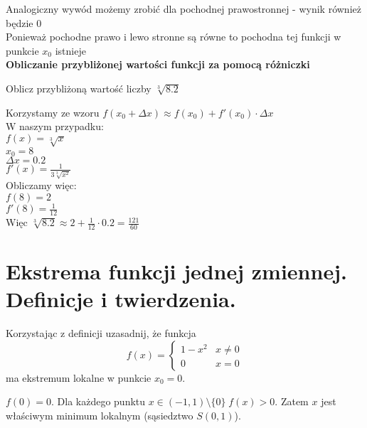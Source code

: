 \documentclass[main.tex]{subfiles}
\begin{document}
    \noindent Analogiczny wywód możemy zrobić dla pochodnej prawostronnej - wynik również będzie 0 \\

    \noindent Ponieważ pochodne prawo i lewo stronne są równe to pochodna tej funkcji w punkcie $x_{0}$ istnieje \\


    \noindent \textbf{Obliczanie przybliżonej wartości funkcji za pomocą różniczki} \\

    \begin{exercise}
        Oblicz przybliżoną wartość liczby $\sqrt[3]{8.2}$
    \end{exercise}

    \noindent Korzystamy ze wzoru $f(x_{0} + \Delta x) \approx f(x_{0}) + f'(x_{0}) \cdot \Delta x$ \\

    \noindent W naszym przypadku: \\
    $f(x) = \sqrt[3]{x}$ \\
    $x_{0} = 8$ \\
    $\Delta x = 0.2$ \\
    $f'(x) = \frac{1}{3\sqrt[3]{x^2}}$ \\

    \noindent Obliczamy więc: \\
    $f(8) = 2$ \\
    $f'(8) = \frac{1}{12}$ \\

    \noindent Więc $\sqrt[3]{8.2} \approx 2 + \frac{1}{12} \cdot 0.2 = \frac{121}{60}$

    \newpage

    \section{Ekstrema funkcji jednej zmiennej. Definicje i twierdzenia.}

    \begin{exercise}
        Korzystając z definicji uzasadnij, że funkcja
        \[f(x) = \begin{cases}
                     1 - x^2 & x \neq 0 \\
                     0 & x = 0
        \end{cases}\]
        ma ekstremum lokalne w punkcie $x_0 = 0$.
    \end{exercise}

    $f(0) = 0$. Dla każdego punktu $x \in (-1, 1) \setminus \{0\}\;  f(x) > 0$. Zatem $x$ jest właściwym minimum lokalnym (sąsiedztwo $S(0, 1)$).
\end{document}
